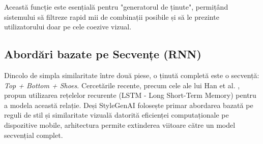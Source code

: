 Această funcție este esențială pentru "generatorul de ținute", permițând sistemului să filtreze rapid mii de combinații posibile și să le prezinte utilizatorului doar pe cele coezive vizual.

\subsection{Abordări bazate pe Secvențe (RNN)}
Dincolo de simpla similaritate între două piese, o ținută completă este o secvență: \textit{Top + Bottom + Shoes}. Cercetările recente, precum cele ale lui Han et al. \cite{han2017learning}, propun utilizarea rețelelor recurente (LSTM - Long Short-Term Memory) pentru a modela această relație.
Deși StyleGenAI folosește primar abordarea bazată pe reguli de stil și similaritate vizuală datorită eficienței computaționale pe dispozitive mobile, arhitectura permite extinderea viitoare către un model secvențial complet.


